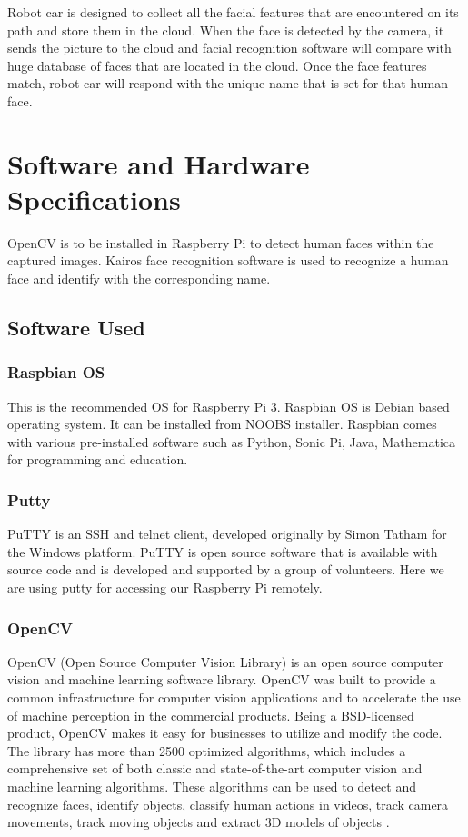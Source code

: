 \documentclass[sigconf]{acmart}
\begin{document}
Robot car is designed to collect all the facial features that are encountered on 
its path and store them in the cloud. When the face is detected by the camera, 
it sends the picture to the cloud and facial recognition software will compare 
with huge database of faces that are located in the cloud. Once the face features 
match, robot car will respond with the unique name that is set for that human face.

\section{Software and Hardware Specifications}
OpenCV is to be installed in Raspberry Pi to detect human faces within the captured 
images. Kairos face recognition software is used to recognize a human face and 
identify with the corresponding name.

\subsection{Software Used}

\subsubsection{Raspbian OS}
This is the recommended OS for Raspberry Pi 3. Raspbian OS is Debian based 
operating system. It can be installed from NOOBS installer. Raspbian comes with 
various pre-installed software such as Python, Sonic Pi, Java, Mathematica for 
programming and education.

\subsubsection{Putty}
PuTTY is an SSH and telnet client, developed originally by Simon Tatham for the 
Windows platform. PuTTY is open source software that is available with source code 
and is developed and supported by a group of volunteers. Here we are using putty 
for accessing our Raspberry Pi remotely.

\subsubsection{OpenCV}
OpenCV (Open Source Computer Vision Library) is an open source computer vision and 
machine learning software library. OpenCV was built to provide a common infrastructure 
for computer vision applications and to accelerate the use of machine perception in the
commercial products. Being a BSD-licensed product, OpenCV makes it easy for businesses 
to utilize and modify the code. The library has more than 2500 optimized algorithms, 
which includes a comprehensive set of both classic and state-of-the-art computer vision 
and machine learning algorithms. These algorithms can be used to detect and recognize 
faces, identify objects, classify human actions in videos, track camera movements, 
track moving objects and extract 3D models of objects \cite{opencv}.
\end{document}
